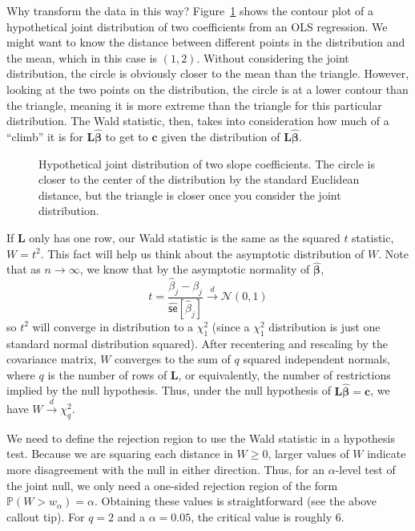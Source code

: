 \documentclass[
  13pt,
  letterpaper,
  DIV=11,
  numbers=noendperiod]{scrreprt}
\newcommand{\mb}{\symbf}
\newcommand{\N}{\mathcal{N}}
\newcommand{\se}{\textsf{se}}
\renewcommand{\P}{\mathbb{P}}
\newcommand{\bhat}{\widehat{\mb{\beta}}}
\newcommand{\indist}{\overset{d}{\to}}
\theoremstyle{definition}
\theoremstyle{definition}
\theoremstyle{plain}
\theoremstyle{remark}
\begin{document}
Why transform the data in this way? Figure~\ref{fig-wald} shows the
contour plot of a hypothetical joint distribution of two coefficients
from an OLS regression. We might want to know the distance between
different points in the distribution and the mean, which in this case is
\((1, 2)\). Without considering the joint distribution, the circle is
obviously closer to the mean than the triangle. However, looking at the
two points on the distribution, the circle is at a lower contour than
the triangle, meaning it is more extreme than the triangle for this
particular distribution. The Wald statistic, then, takes into
consideration how much of a ``climb'' it is for \(\mb{L}\bhat\) to get
to \(\mb{c}\) given the distribution of \(\mb{L}\bhat\).

\begin{figure}[th]


\caption{\label{fig-wald}Hypothetical joint distribution of two slope
coefficients. The circle is closer to the center of the distribution by
the standard Euclidean distance, but the triangle is closer once you
consider the joint distribution.}

\end{figure}%

If \(\mb{L}\) only has one row, our Wald statistic is the same as the
squared \(t\) statistic, \(W = t^2\). This fact will help us think about
the asymptotic distribution of \(W\). Note that as \(n\to\infty\), we
know that by the asymptotic normality of \(\bhat\), \[ 
t = \frac{\widehat{\beta}_{j} - \beta_{j}}{\widehat{\se}[\widehat{\beta}_{j}]} \indist \N(0,1)
\] so \(t^2\) will converge in distribution to a \(\chi^2_1\) (since a
\(\chi^2_1\) distribution is just one standard normal distribution
squared). After recentering and rescaling by the covariance matrix,
\(W\) converges to the sum of \(q\) squared independent normals, where
\(q\) is the number of rows of \(\mb{L}\), or equivalently, the number
of restrictions implied by the null hypothesis. Thus, under the null
hypothesis of \(\mb{L}\bhat = \mb{c}\), we have
\(W \indist \chi^2_{q}\).

We need to define the rejection region to use the Wald statistic in a
hypothesis test. Because we are squaring each distance in \(W \geq 0\),
larger values of \(W\) indicate more disagreement with the null in
either direction. Thus, for an \(\alpha\)-level test of the joint null,
we only need a one-sided rejection region of the form
\(\P(W > w_{\alpha}) = \alpha\). Obtaining these values is
straightforward (see the above callout tip). For \(q = 2\) and a
\(\alpha = 0.05\), the critical value is roughly 6.
\end{document}
